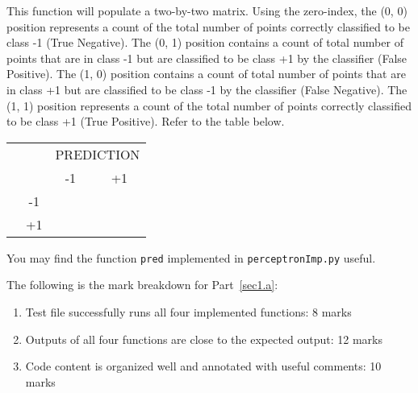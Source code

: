 \documentclass{article}
\theoremstyle{definition}
\begin{document}
\begin{itemize}
{			This function will populate a two-by-two matrix. Using the zero-index, the (0, 0) position represents
			a count of the total number of points correctly classified to be class -1 (True Negative).
			The (0, 1) position contains a count of total number of points that are in class -1 but are
			classified to be class +1 by the classifier (False Positive). The (1, 0) position contains a count
			of total number of points that are in class +1 but are classified to be class -1 by the classifier
			(False Negative). The (1, 1) position represents a count of the total number of points correctly
			classified to be class +1 (True Positive). Refer to the table below.
			\begin{center}
				\begin{tabular}{ cccc } 
					& & \multicolumn{2}{c}{PREDICTION} \\ 
					\multirow{4}{*}{\rotatebox{90}{ACTUAL}} & & -1 & +1 \\ %
					& -1 & \cellcolor{blue!25}{True Negative} & \cellcolor{red!25}{False Positive}  \\%
					& +1 & \cellcolor{red!25}{False Negative} & \cellcolor{blue!25}{True Positive}  \\ %
				\end{tabular}
			\end{center}
			You may find the function \verb|pred| implemented in \verb|perceptronImp.py| useful.}
\end{itemize}

The following is the mark breakdown for Part~\ref{sec1.a}:
\begin{enumerate}[label=(\roman*)]
	\item Test file successfully runs all four implemented functions: 8 marks
	\item Outputs of all four functions are close to the expected output: 12 marks
	\item Code content is organized well and annotated with useful comments: 10 marks
\end{enumerate}
\end{document}
